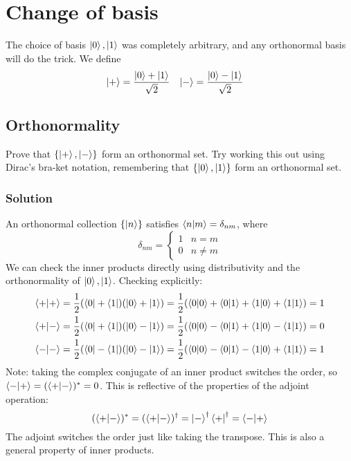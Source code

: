 \documentclass{article}
\begin{document}
\section*{Change of basis}
The choice of basis $\ket{0}, \ket{1}$ was completely arbitrary, and any orthonormal basis will do the trick. We define
\begin{align}
\ket{+} &= \frac{\ket{0}+\ket{1}}{\sqrt{2}} & \ket{-} &= \frac{\ket{0}-\ket{1}}{\sqrt{2}}
\end{align}

\subsection*{Orthonormality}
Prove that $\{\ket{+}, \ket{-}\}$ form an orthonormal set. Try working this out using Dirac's bra-ket notation, remembering that $\{\ket{0}, \ket{1}\}$ form an orthonormal set.

\subsubsection*{Solution}
An orthonormal collection $\{\ket{n}\}$ satisfies $\braket{n}{m} = \delta_{nm}$, where 
$$
\delta_{nm}
=\begin{cases}
1 & n = m\\
0 & n \neq m
\end{cases}
$$
We can check the inner products directly using distributivity and the orthonormality of $\ket{0}, \ket{1}$. Checking explicitly:
\begin{align*}
\braket{+}{+} &= \frac{1}{2}(\bra 0 + \bra 1)(\ket 0 + \ket 1) = \frac{1}{2}(\braket{0}{0} + \braket{0}{1} + \braket{1}{0} + \braket{1}{1}) = 1 \\
\braket{+}{-} &= \frac{1}{2}(\bra 0 + \bra 1)(\ket 0 - \ket 1) = \frac{1}{2}(\braket{0}{0} - \braket{0}{1} + \braket{1}{0} - \braket{1}{1}) = 0 \\
\braket{-}{-} &= \frac{1}{2}(\bra 0 - \bra 1)(\ket 0 - \ket 1) = \frac{1}{2}(\braket{0}{0} - \braket{0}{1} - \braket{1}{0} + \braket{1}{1}) = 1 \\
\end{align*}
Note: taking the complex conjugate of an inner product switches the order, so $\braket{-}{+} = (\braket{+}{-})^\ast = 0$. This is reflective of the properties of the adjoint operation:
$$
(\braket{+}{-})^\ast = (\braket{+}{-})^\dagger = \ket{-}^\dagger \bra{+}^\dagger = \braket{-}{+}
$$
The adjoint switches the order just like taking the transpose. This is also a general property of inner products.
\end{document}
